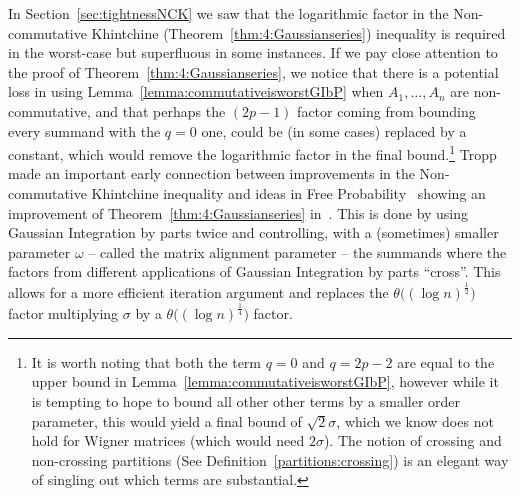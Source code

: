 In Section~\ref{sec:tightnessNCK} we saw that the logarithmic factor in the Non-commutative Khintchine (Theorem~\ref{thm:4:Gaussianseries}) inequality is required in the worst-case but superfluous in some instances. If we pay close attention to the proof of Theorem~\ref{thm:4:Gaussianseries}, we notice that there is a potential loss in using Lemma~\ref{lemma:commutativeisworstGIbP} when $A_1,\dots,A_n$ are non-commutative, and that perhaps the $(2p-1)$ factor coming from bounding every summand with the $q=0$ one, could be (in some cases) replaced by a constant, which would remove the logarithmic factor in the final bound.\footnote{It is worth noting that both the term $q=0$ and $q=2p-2$ are equal to the upper bound in Lemma~\ref{lemma:commutativeisworstGIbP}, however while it is tempting to hope to bound all other other terms by a smaller order parameter, this would yield a final bound of $\sqrt{2}\sigma$, which we know does not hold for Wigner matrices (which would need $2\sigma$). The notion of crossing and non-crossing partitions (See Definition~\ref{partitions:crossing}) is an elegant way of singling out which terms are substantial.}
 Tropp~\cite{Tropp:TailBoundsSecondOrder} made an important early connection between improvements in the Non-commutative Khintchine inequality and ideas in Free Probability~\cite{NicaSpeicher-FreeProbability} showing an improvement of Theorem~\ref{thm:4:Gaussianseries} in~\cite{Tropp:TailBoundsSecondOrder}. This is done by using Gaussian Integration by parts twice and controlling, with a (sometimes) smaller parameter $\omega$ -- called the matrix alignment parameter -- the summands where the factors from different applications of Gaussian Integration by parts ``cross''. This allows for a more efficient iteration argument and replaces the $\theta\big((\log n)^{\frac12}\big)$ factor multiplying $\sigma$ by a $\theta\big((\log n)^{\frac14}\big)$ factor.

